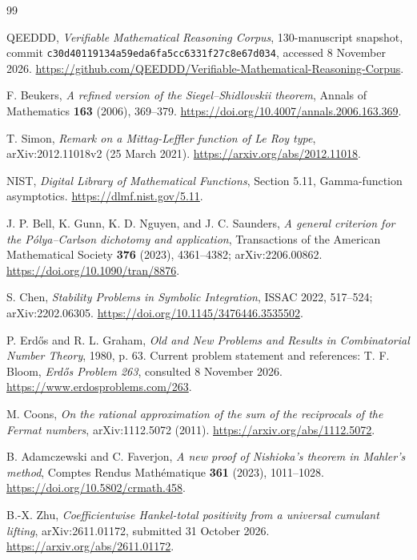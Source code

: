 \documentclass[11pt,a4paper]{article}
\theoremstyle{definition}
\theoremstyle{remark}
\numberwithin{equation}{section}
\begin{document}
\begin{thebibliography}{99}
\raggedright

QEEDDD, \emph{Verifiable Mathematical Reasoning Corpus},
130-manuscript snapshot, commit
\texttt{c30d40119134a59eda6fa5cc6331f27c8e67d034}, accessed
8 November 2026.
\url{https://github.com/QEEDDD/Verifiable-Mathematical-Reasoning-Corpus}.

F. Beukers, \emph{A refined version of the Siegel--Shidlovskii theorem},
Annals of Mathematics \textbf{163} (2006), 369--379.
\url{https://doi.org/10.4007/annals.2006.163.369}.

T. Simon, \emph{Remark on a Mittag-Leffler function of Le Roy type},
arXiv:2012.11018v2 (25 March 2021).
\url{https://arxiv.org/abs/2012.11018}.

NIST, \emph{Digital Library of Mathematical Functions},
Section 5.11, Gamma-function asymptotics.
\url{https://dlmf.nist.gov/5.11}.

J. P. Bell, K. Gunn, K. D. Nguyen, and J. C. Saunders,
\emph{A general criterion for the P\'olya--Carlson dichotomy and application},
Transactions of the American Mathematical Society \textbf{376} (2023),
4361--4382; arXiv:2206.00862.
\url{https://doi.org/10.1090/tran/8876}.

S. Chen, \emph{Stability Problems in Symbolic Integration},
ISSAC 2022, 517--524; arXiv:2202.06305.
\url{https://doi.org/10.1145/3476446.3535502}.

P. Erd\H{o}s and R. L. Graham, \emph{Old and New Problems and Results
in Combinatorial Number Theory}, 1980, p. 63.
Current problem statement and references: T. F. Bloom,
\emph{Erd\H{o}s Problem 263}, consulted 8 November 2026.
\url{https://www.erdosproblems.com/263}.

M. Coons, \emph{On the rational approximation of the sum of the
reciprocals of the Fermat numbers}, arXiv:1112.5072 (2011).
\url{https://arxiv.org/abs/1112.5072}.

B. Adamczewski and C. Faverjon,
\emph{A new proof of Nishioka's theorem in Mahler's method},
Comptes Rendus Math\'ematique \textbf{361} (2023), 1011--1028.
\url{https://doi.org/10.5802/crmath.458}.

B.-X. Zhu, \emph{Coefficientwise Hankel-total positivity from a
universal cumulant lifting}, arXiv:2611.01172, submitted
31 October 2026.
\url{https://arxiv.org/abs/2611.01172}.

\end{thebibliography}
\end{document}
